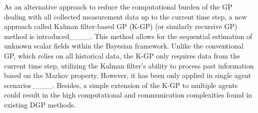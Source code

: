 As an alternative approach to reduce the computational burden of the GP dealing with all collected measurement data up to the current time step, a new approach called Kalman filter-based GP (K-GP) (or similarly recursive GP) method is introduced____. This method allows for the sequential estimation of unknown scalar fields within the Bayesian framework. Unlike the conventional GP, which relies on all historical data, the K-GP only requires data from the current time step, utilizing the Kalman filter's ability to process past information based on the Markov property. However, it has been only applied in single agent scenarios____.
Besides, a simple extension of the K-GP to multiple agents could result in the high computational and communication complexities found in existing DGP methods.
